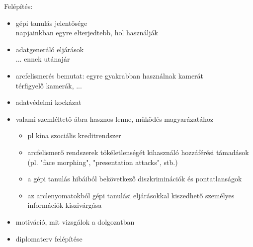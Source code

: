

\newpage
Felépítés:
\begin{itemize}
	\item gépi tanulás jelentősége \\ napjainkban egyre elterjedtebb, hol használják
	\item adatgeneráló eljárások \\ ... ennek utánajár
	\item arcfelismerés bemutat: egyre gyakrabban használnak kamerát \\ térfigyelő kamerák, ...
	\item adatvédelmi kockázat
	\item valami szemléltető ábra hasznos lenne, működés magyarázatához
	\begin{itemize}
		\item pl kína szociális kreditrendszer
		\item  arcfelismerő rendszerek tökéletlenségét kihasználó hozzáférési támadások (pl. "face morphing", "presentation attacks", stb.)
		\item a gépi tanulás hibáiból bekövetkező diszkriminációk és pontatlanságok
		\item az arclenyomatokból gépi tanulási eljárásokkal kiszedhető személyes információk kiszivárgása
	\end{itemize}
	\item motiváció, mit vizsgálok a dolgozatban
	\item diplomaterv felépítése
\end{itemize}
